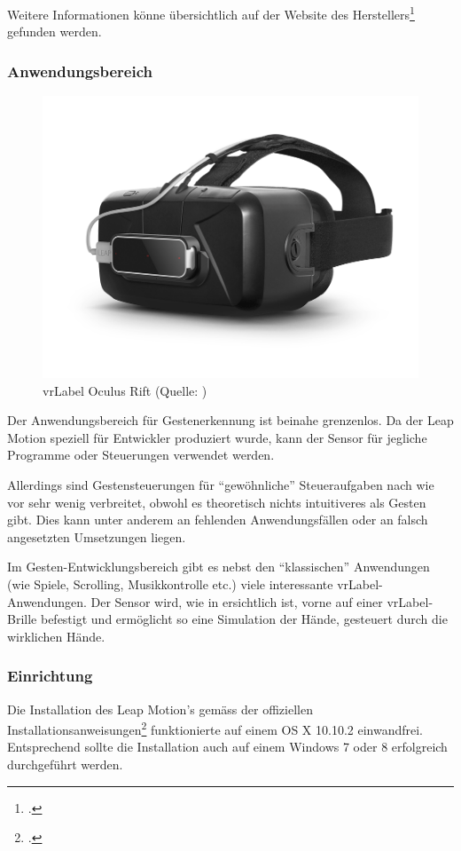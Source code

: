 Weitere Informationen könne übersichtlich auf der Website des Herstellers\footcite{Leap_Motion_Motion_Controller_2015-03-27} gefunden werden.

\subsubsection{Anwendungsbereich}
\begin{figure}
	\includegraphics[width=1.0\linewidth]{images/analysis/leap_vr.png}
	\caption[Oculus Rift VR]{\gls{vrLabel} Oculus Rift (Quelle: )}
	\label{fig:leap_vr}
\end{figure}
Der Anwendungsbereich für Gestenerkennung ist beinahe grenzenlos.
Da der Leap Motion speziell für Entwickler produziert wurde, kann der Sensor für jegliche Programme oder Steuerungen verwendet werden.

Allerdings sind Gestensteuerungen für "`gewöhnliche"' Steueraufgaben nach wie vor sehr wenig verbreitet, obwohl es theoretisch nichts intuitiveres als Gesten gibt.
Dies kann unter anderem an fehlenden Anwendungsfällen oder an falsch angesetzten Umsetzungen liegen.

Im Gesten-Entwicklungsbereich gibt es nebst den "`klassischen"' Anwendungen (wie Spiele, Scrolling, Musikkontrolle etc.) viele interessante  \gls{vrLabel}-Anwendungen. Der Sensor wird, wie in  ersichtlich ist, vorne auf einer \gls{vrLabel}-Brille befestigt und ermöglicht so eine Simulation der Hände, gesteuert durch die wirklichen Hände.

\subsubsection{Einrichtung}
Die Installation des Leap Motion's gemäss der offiziellen Installationsanweisungen\footcite{Getting_Started_Leap_Motion_Developers_2015-03-28} funktionierte auf einem OS X 10.10.2 einwandfrei.
Entsprechend sollte  die Installation auch auf einem Windows 7 oder 8 erfolgreich durchgeführt werden.

